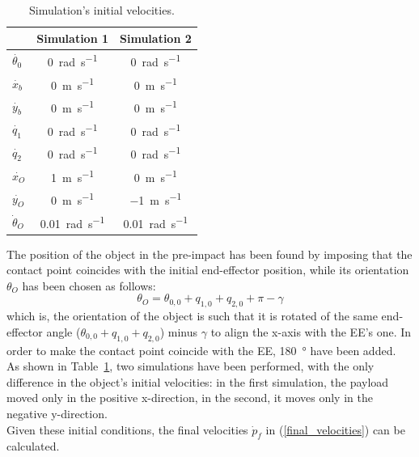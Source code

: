 \documentclass[a4paper,12pt,oneside]{report}
\begin{document}
\begin{table}
  \caption{Simulation's initial velocities.}
  \label{initial_velocities}
  \begin{center}
  \begin{tabular}{lcc}
    \toprule
    &\textbf{Simulation 1}&\textbf{Simulation 2}\\
  \midrule
  $\dot{\theta_0}$&\SI{0}{\radian\per\second}&\SI{0}{\radian\per\second}\\
  $\dot{x_b}$&\SI{0}{\metre\per\second}&\SI{0}{\metre\per\second}\\
  $\dot{y_b}$&\SI{0}{\metre\per\second}&\SI{0}{\metre\per\second}\\
  $\dot{q_1}$&\SI{0}{\radian\per\second}&\SI{0}{\radian\per\second}\\
  $\dot{q_2}$&\SI{0}{\radian\per\second}&\SI{0}{\radian\per\second}\\
  $\dot{x_O}$&\SI{1}{\metre\per\second}&\SI{0}{\metre\per\second}\\
  $\dot{y_O}$&\SI{0}{\metre\per\second}&\SI{-1}{\metre\per\second}\\
  $\dot{\theta}_O$&\SI{0.01}{\radian\per\second}&\SI{0.01}{\radian\per\second}\\
  \bottomrule
  \end{tabular}
  \end{center}
\end{table}
The position of the object in the pre-impact has been found by imposing that the contact point coincides with the initial end-effector position, while its orientation $\theta_O$ has been chosen as follows:
\begin{equation}
  \theta_O=\theta_{0,0}+q_{1,0}+q_{2,0}+\pi-\gamma
  \label{contact_rotation}
\end{equation}
which is, the orientation of the object is such that it is rotated of the same end-effector angle ($\theta_{0,0}+q_{1,0}+q_{2,0}$) minus $\gamma$ to align the x-axis with the EE's one. In order to make the contact point coincide with the EE, \SI{180}{\degree} have been added.\\
As shown in Table~\ref{initial_velocities}, two simulations have been performed, with the only difference in the object's initial velocities: in the first simulation, the payload moved only in the positive x-direction, in the second, it moves only in the negative y-direction.\\
Given these initial conditions, the final velocities $\dot{p}_f$ in (\ref{final_velocities}) can be calculated.\\
\end{document}
